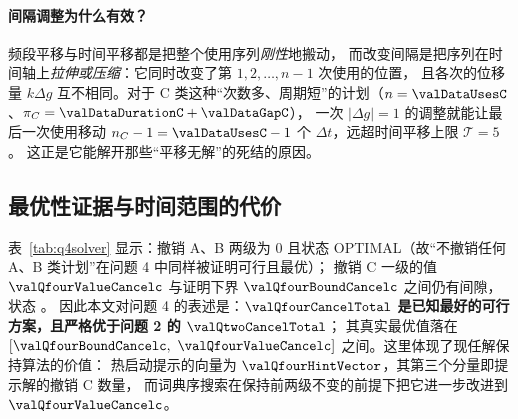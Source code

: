 

\paragraph{间隔调整为什么有效？}频段平移与时间平移都是把整个使用序列\emph{刚性}地搬动，
而改变间隔是把序列在时间轴上\emph{拉伸或压缩}：它同时改变了第 $1,2,\dots,n-1$ 次使用的位置，
且各次的位移量 $k\Delta g$ 互不相同。对于 C 类这种“次数多、周期短”的计划（$n=\valDataUsesC$、$\pi_C=\valDataDurationC+\valDataGapC$），
一次 $|\Delta g|=1$ 的调整就能让最后一次使用移动 $n_C-1=\valDataUsesC-1$ 个 $\Delta t$，远超时间平移上限 $\mathcal{T}=5$。
这正是它能解开那些“平移无解”的死结的原因。

\subsection{最优性证据与时间范围的代价}
\label{sec:q4horizon}

\begin{table}[htbp]
\centering\footnotesize
\caption{问题 4 逐级求解证据（列的含义同表~\ref{tab:q2solver}）。与问题 2 不同，本题的“撤销 C”一级
在时限内未能闭合间隙，故 $\valQfourCancelTotal$ 是\emph{已知最好的可行值}而非已证明的最优值。}
\label{tab:q4solver}
\setlength{\tabcolsep}{4pt}
\resizebox{\linewidth}{!}{}
\end{table}

表~\ref{tab:q4solver} 显示：撤销 A、B 两级为 $0$ 且状态 \textsf{OPTIMAL}（故“不撤销任何 A、B 类计划”在问题 4 中同样被证明可行且最优）；
撤销 C 一级的值 $\valQfourValueCancelc$ 与证明下界 $\valQfourBoundCancelc$ 之间仍有间隙，状态 \textsf{\valQfourStatusCancelc}。
因此本文对问题 4 的表述是：\textbf{$\valQfourCancelTotal$ 是已知最好的可行方案，且严格优于问题 2 的 $\valQtwoCancelTotal$}；
其真实最优值落在 $[\valQfourBoundCancelc,\ \valQfourValueCancelc]$ 之间。这里体现了现任解保持算法的价值：
热启动提示的向量为 $\valQfourHintVector$，其第三个分量即提示解的撤销 C 数量，
而词典序搜索在保持前两级不变的前提下把它进一步改进到 $\valQfourValueCancelc$。

